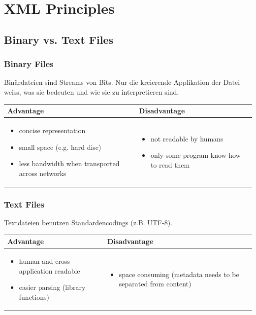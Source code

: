 \chapter{XML Principles}
\section{Binary vs. Text Files}

\subsection{Binary Files}
Binärdateien sind Streams von Bits. Nur die kreierende Applikation der Datei weiss, was sie bedeuten und wie sie zu interpretieren sind.

\begin{tabular}{|p{6cm}|p{6cm}|}
\hline 
Advantage & Disadvantage \\ 
\hline 
\begin{itemize}
\item concise representation 
\item small space (e.g. hard disc)
\item less bandwidth when transported across networks 
\end{itemize} & 
\begin{itemize}
\item not readable by humans
\item only some program know how to read them
\end{itemize} \\
\hline 
\end{tabular} 

\subsection{Text Files}
Textdateien benutzen Standardencodings (z.B. UTF-8).\\

\begin{tabular}{|p{6cm}|p{6cm}|}
\hline 
Advantage & Disadvantage \\ 
\hline 
\begin{itemize}
\item human and cross-application readable
\item easier parsing (library functions)
\end{itemize} & 
\begin{itemize}
\item  space consuming (metadata needs to be separated from content) 
\end{itemize} \\ 
\hline 
\end{tabular} 

